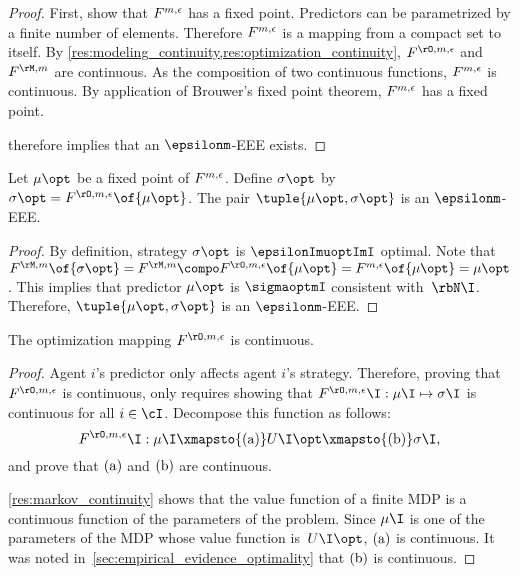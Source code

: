 \begin{proof}
First, show that \(F^{m, \epsilon}\) has a fixed point.
Predictors can be parametrized by a finite number of elements.
Therefore \(F^{m, \epsilon}\) is a mapping from a compact set to itself.
By \cref{res:modeling_continuity,res:optimization_continuity}, \(\FO\) and \(\FM\) are continuous.
As the composition of two continuous functions, \(F^{m, \epsilon}\) is continuous.
By application of Brouwer's fixed point theorem, \(F^{m, \epsilon}\) has a fixed point.

 therefore implies that an \(\epsilonm\)-EEE exists.
\end{proof}

\begin{proposition}
\label{res:fixed_point_EEE}
Let \(\mu\opt\) be a fixed point of \(F^{m, \epsilon}\).
Define \(\sigma\opt\) by \(\sigma\opt = \FO \of{\mu\opt}\).
The pair \(\tuple{\mu\opt, \sigma\opt}\) is an \(\epsilonm\)-EEE.
\end{proposition}

\begin{proof}
By definition, strategy \(\sigma\opt\) is \(\epsilonImuoptImI\) optimal.
Note that \(\FM \of{\sigma\opt} = \FM \compo \FO \of{\mu\opt} = \FF \of{\mu\opt} = \mu\opt\).
This implies that predictor \(\mu\opt\) is \(\sigmaoptmI\) consistent with~\(\rbN\I\).
Therefore, \(\tuple{\mu\opt, \sigma\opt}\) is an \(\epsilonm\)-EEE.
\end{proof}

\begin{proposition}
\label{res:optimization_continuity}
The optimization mapping \(\FO\) is continuous.
\end{proposition}

\begin{proof}
Agent \(i\)'s predictor only affects agent \(i\)'s strategy.
Therefore, proving that \(\FO\) is continuous, only requires showing that \(\FO\I: \mu\I \mapsto \sigma\I\) is continuous for all \(i \in \cI\).
Decompose this function as follows:
\[
\FO\I: \mu\I \xmapsto{\subfunc{a}} U\I\opt \xmapsto{\subfunc{b}} \sigma\I,
\]
and prove that \(\mathrm{(a)}\) and \(\mathrm{(b)}\) are continuous.

\cref{res:markov_continuity} shows that the value function of a finite MDP is a continuous function of the parameters of the problem.
Since \(\mu\I\) is one of the parameters of the MDP whose value function is~\(U\I\opt\), \(\mathrm{(a)}\) is continuous.
It was noted in~\cref{sec:empirical_evidence_optimality} that \(\mathrm{(b)}\) is continuous.
\end{proof}

